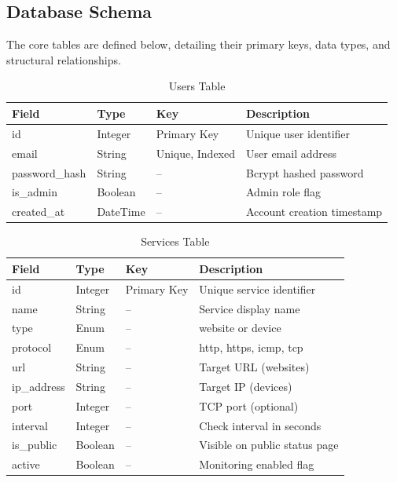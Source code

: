 \documentclass[12pt,a4paper,oneside]{report}
\begin{document}
\subsection{Database Schema}
\noindent The core tables are defined below, detailing their primary keys, data types, and structural relationships.

\begin{table}[H]
\centering
\begin{tabularx}{\textwidth}{|l|l|l|X|}
\hline
\textbf{Field} & \textbf{Type} & \textbf{Key} & \textbf{Description} \\
\hline
id & Integer & Primary Key & Unique user identifier \\
email & String & Unique, Indexed & User email address \\
password\_hash & String & -- & Bcrypt hashed password \\
is\_admin & Boolean & -- & Admin role flag \\
created\_at & DateTime & -- & Account creation timestamp \\
\hline
\end{tabularx}
\caption{Users Table}
\label{tab:users}
\end{table}

\begin{table}[H]
\centering
\begin{tabularx}{\textwidth}{|l|l|l|X|}
\hline
\textbf{Field} & \textbf{Type} & \textbf{Key} & \textbf{Description} \\
\hline
id & Integer & Primary Key & Unique service identifier \\
name & String & -- & Service display name \\
type & Enum & -- & website or device \\
protocol & Enum & -- & http, https, icmp, tcp \\
url & String & -- & Target URL (websites) \\
ip\_address & String & -- & Target IP (devices) \\
port & Integer & -- & TCP port (optional) \\
interval & Integer & -- & Check interval in seconds \\
is\_public & Boolean & -- & Visible on public status page \\
active & Boolean & -- & Monitoring enabled flag \\
\hline
\end{tabularx}
\caption{Services Table}
\label{tab:services}
\end{table}
\end{document}
